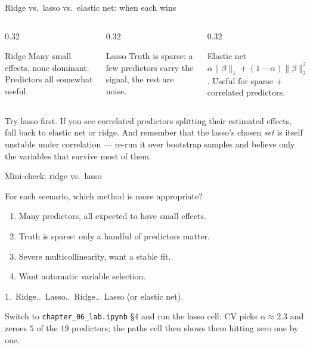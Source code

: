 \documentclass[aspectratio=169,11pt]{beamer}
\begin{document}
\begin{frame}{Ridge vs.\ lasso vs.\ elastic net: when each wins}\label{frm:elastic}
  \begin{columns}[T]
    \begin{column}{0.32\textwidth}
      \begin{block}{Ridge}
        Many small effects, none dominant. Predictors all somewhat
        useful.
      \end{block}
    \end{column}
    \begin{column}{0.32\textwidth}
      \begin{block}{Lasso}
        Truth is sparse: a few predictors carry the signal, the rest
        are noise.
      \end{block}
    \end{column}
    \begin{column}{0.32\textwidth}
      \begin{block}{Elastic net}
        $\alpha\|\beta\|_1 + (1-\alpha)\|\beta\|_2^2$. Useful for
        sparse + correlated predictors.
      \end{block}
    \end{column}
  \end{columns}
  \begin{takeaway}
    Try lasso first. If you see correlated predictors splitting their
    estimated effects, fall back to elastic net or ridge. And remember
    that the lasso's chosen \emph{set} is itself unstable under
    correlation --- re-run it over bootstrap samples and believe only the
    variables that survive most of them.
  \end{takeaway}
\end{frame}


\begin{frame}{Mini-check: ridge vs.\ lasso}
  \begin{readme}
    For each scenario, which method is more appropriate?
    \begin{enumerate}
      \item Many predictors, all expected to have small effects.
      \item Truth is sparse: only a handful of predictors matter.
      \item Severe multicollinearity, want a stable fit.
      \item Want automatic variable selection.
    \end{enumerate}
  \end{readme}
  \begin{takeaway}[Answers]
    1.\ Ridge..\ Lasso..\ Ridge..\ Lasso (or elastic
    net).
  \end{takeaway}
  \begin{labnote}
    Switch to \texttt{chapter\_06\_lab.ipynb} \S4 and run the lasso cell: CV picks
    $\alpha \approx 2.3$ and zeroes $5$ of the $19$ predictors; the paths cell then
    shows them hitting zero one by one.
  \end{labnote}
\end{frame}
\end{document}
